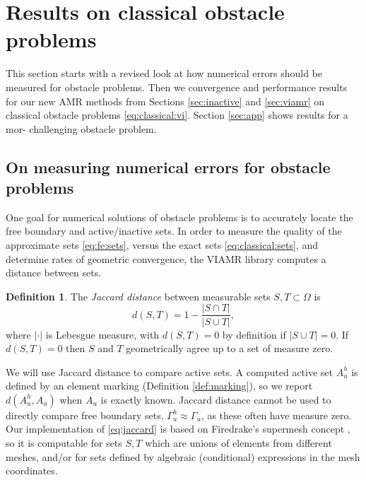\documentclass[]{interact}
\theoremstyle{plain}%
\theoremstyle{definition}
\newtheorem{definition}[theorem]{Definition}
\theoremstyle{remark}
\begin{document}
\section{Results on classical obstacle problems} \label{sec:results}

This section starts with a revised look at how numerical errors should be measured for obstacle problems.  Then we convergence and performance results for our new AMR methods from Sections \ref{sec:inactive} and \ref{sec:viamr} on classical obstacle problems \eqref{eq:classical:vi}.  Section \ref{sec:app} shows results for a mor- challenging obstacle problem.

\subsection{On measuring numerical errors for obstacle problems} \label{subsec:measures}  One goal for numerical solutions of obstacle problems is to accurately locate the free boundary and active/inactive sets.  In order to measure the quality of the approximate sets \eqref{eq:fe:sets}, versus the exact sets \eqref{eq:classical:sets}, and determine rates of geometric convergence, the VIAMR library computes a distance between sets.

\begin{definition} \label{def:jaccard}
The \emph{Jaccard distance} \cite{LevandowskyWinter1971} between measurable sets $S,T \subset \Omega$ is
\begin{equation}
d(S,T) = 1 - \frac{|S \cap T|}{|S \cup T|}, \label{eq:jaccard}
\end{equation}
where $|\cdot|$ is Lebesgue measure, with $d(S,T)=0$ by definition if $|S \cup T|=0$.  If $d(S,T)=0$ then $S$ and $T$ geometrically agree up to a set of measure zero.
\end{definition}

We will use Jaccard distance to compare active sets.  A computed active set $A_u^h$ is defined by an element marking (Definition \ref{def:marking}), so we report $d(A_u^h,A_u)$ when $A_u$ is exactly known.  Jaccard distance cannot be used to directly compare free boundary sets, $\Gamma_u^h \approx \Gamma_u$, as these often have measure zero.  Our implementation of \eqref{eq:jaccard} is based on Firedrake's supermesh concept \cite{Farrelletal2009}, so it is computable for sets $S,T$ which are unions of elements from different meshes, and/or for sets defined by algebraic (conditional) expressions in the mesh coordinates.
\end{document}
